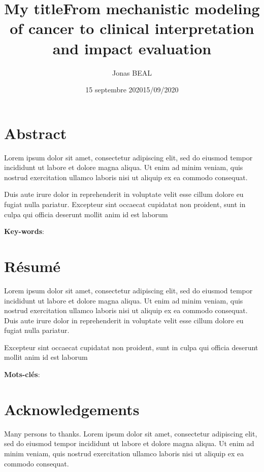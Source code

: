 \documentclass[a4paper,12pt,twoside,onecolumn,openright,final,oldfontcommands]{memoir}
\title{My title}
\author{Jonas BEAL}
\institute{l'Institut Curie}
\institute{l'Institut Curie}
\date{15 septembre 2020}
\title{From mechanistic modeling of cancer to clinical interpretation and
impact evaluation}
\date{15/09/2020}
\newcommand{\initial}[1]{
	\lettrine[lines=3,lhang=0.33,nindent=0em]{
		\color{gray}
     		{\textsc{#1}}}{}}
\newcommand\blankpage{%
    \null
    \thispagestyle{empty}%
    \newpage
    }
\begin{document}
\maketitle

\chapter*{Abstract}

\initial{L}orem ipsum dolor sit amet, consectetur adipiscing elit, sed
do eiusmod tempor incididunt ut labore et dolore magna aliqua. Ut enim
ad minim veniam, quis nostrud exercitation ullamco laboris nisi ut
aliquip ex ea commodo consequat.

Duis aute irure dolor in reprehenderit in voluptate velit esse cillum
dolore eu fugiat nulla pariatur. Excepteur sint occaecat cupidatat non
proident, sunt in culpa qui officia deserunt mollit anim id est laborum

\vspace{\baselineskip}

\textbf{Key-words}:

\chapter*{Résumé}

\initial{L}orem ipsum dolor sit amet, consectetur adipiscing elit, sed
do eiusmod tempor incididunt ut labore et dolore magna aliqua. Ut enim
ad minim veniam, quis nostrud exercitation ullamco laboris nisi ut
aliquip ex ea commodo consequat. Duis aute irure dolor in reprehenderit
in voluptate velit esse cillum dolore eu fugiat nulla pariatur.

Excepteur sint occaecat cupidatat non proident, sunt in culpa qui
officia deserunt mollit anim id est laborum

\vspace{\baselineskip}

\textbf{Mots-clés}:

\afterpage{\blankpage}

\chapter*{Acknowledgements}

\initial{M}any persons to thanks. Lorem ipsum dolor sit amet,
consectetur adipiscing elit, sed do eiusmod tempor incididunt ut labore
et dolore magna aliqua. Ut enim ad minim veniam, quis nostrud
exercitation ullamco laboris nisi ut aliquip ex ea commodo consequat.
\end{document}
